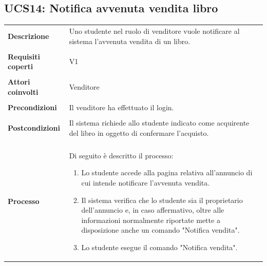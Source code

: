 \documentclass[10pt,a4paper]{report}
\begin{document}
	\subsection{UCS14: Notifica avvenuta vendita libro}
	\begin{tabular}{lp{}}
		\textbf{Descrizione}&Uno studente nel ruolo di venditore vuole notificare al sistema l'avvenuta vendita di un libro.\\
		\\
		\textbf{Requisiti coperti}&V1\\
		\\
		\textbf{Attori coinvolti}&Venditore\\
		\\
		\textbf{Precondizioni}&Il venditore ha effettuato il login.\\
		\\
		\textbf{Postcondizioni}&Il sistema richiede allo studente indicato come acquirente del libro in oggetto di confermare l'acquisto.\\
		\\
		\textbf{Processo}&Di seguito è descritto il processo:
		\begin{enumerate}
			\item Lo studente accede alla pagina relativa all'annuncio di cui intende notificare l'avvenuta vendita.
			\item Il sistema verifica che lo studente sia il proprietario dell'annuncio e, in caso affermativo, oltre alle informazioni normalmente riportate mette a disposizione anche un comando "Notifica vendita".
			\item Lo studente esegue il comando "Notifica vendita".
			

\end{enumerate}
\end{tabular}
\end{document}
